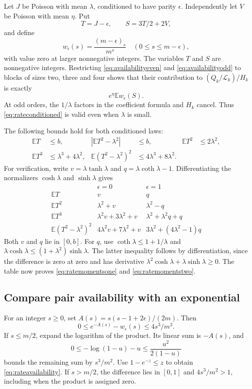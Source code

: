 \documentclass[11pt]{article}
\theoremstyle{definition}
\theoremstyle{remark}
\newcommand{\E}{\mathbb E}
\newcommand{\1}{\mathbf 1}
\begin{document}
Let $J$ be Poisson with mean $\lambda$, conditioned to have parity $\epsilon$. Independently let $V$ be Poisson with mean $\eta$. Put
\[
T=J-\epsilon,\qquad S=3T/2+2V,
\]
and define
\[
w_\epsilon(s)=\frac{(m-\epsilon)_s}{m^s}
\quad(0\le s\le m-\epsilon),
\]
with value zero at larger nonnegative integers. The variables $T$ and $S$ are nonnegative integers. Restricting \eqref{eq:availabilityeven} and \eqref{eq:availabilityodd} to blocks of sizes two, three and four shows that their contribution to $(Q_k/\mathcal L_k)/H_k$ is exactly
\begin{equation}\label{eq:rateconditioned}
e^\eta\E w_\epsilon(S).
\end{equation}
At odd orders, the $1/\lambda$ factors in the coefficient formula and $H_k$ cancel. Thus \eqref{eq:rateconditioned} is valid even when $\lambda$ is small.

The following bounds hold for both conditioned laws:
\begin{align}
\E T&\le b,&
|\E T^2-\lambda^2|&\le b,&
\E T^2&\le2\lambda^2,\label{eq:ratemomentsone}\\
\E T^3&\le\lambda^3+4\lambda^2,&
\E(T^2-\lambda^2)^2&\le4\lambda^3+8\lambda^2.
&&\label{eq:ratemomentstwo}
\end{align}
For verification, write $v=\lambda\tanh\lambda$ and $q=\lambda\coth\lambda-1$. Differentiating the normalizers $\cosh\lambda$ and $\sinh\lambda$ gives
\[
\begin{array}{c|cc}
&\epsilon=0&\epsilon=1\\ \hline
\E T&v&q\\
\E T^2&\lambda^2+v&\lambda^2-q\\
\E T^3&\lambda^2v+3\lambda^2+v&\lambda^2+\lambda^2q+q\\
\E(T^2-\lambda^2)^2&4\lambda^2v+7\lambda^2+v&3\lambda^2+(4\lambda^2-1)q
\end{array}
\]
Both $v$ and $q$ lie in $[0,b]$. For $q$, use $\coth\lambda\le1+1/\lambda$ and
$\lambda\cosh\lambda\le(1+\lambda^2)\sinh\lambda$. The latter inequality follows by differentiation, since the difference is zero at zero and has derivative $\lambda^2\cosh\lambda+\lambda\sinh\lambda\ge0$. The table now proves \eqref{eq:ratemomentsone} and \eqref{eq:ratemomentstwo}.

\subsection{Compare pair availability with an exponential}

For an integer $s\ge0$, set $A(s)=s(s-1+2\epsilon)/(2m)$. Then
\begin{equation}\label{eq:rateavailability}
0\le e^{-A(s)}-w_\epsilon(s)\le4s^3/m^2.
\end{equation}
If $s\le m/2$, expand the logarithm of the product. Its linear sum is $-A(s)$, and
\[
0\le-\log(1-u)-u\le\frac{u^2}{2(1-u)}
\]
bounds the remaining sum by $s^3/m^2$. Use $1-e^{-z}\le z$ to obtain \eqref{eq:rateavailability}. If $s>m/2$, the difference lies in $[0,1]$ and $4s^3/m^2>1$, including when the product is assigned zero.
\end{document}
